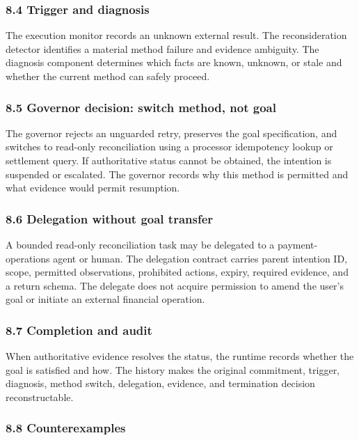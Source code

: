 \subsubsection{8.4 Trigger and diagnosis}\label{trigger-and-diagnosis}

The execution monitor records an unknown external result. The reconsideration detector identifies a material method failure and evidence ambiguity. The diagnosis component determines which facts are known, unknown, or stale and whether the current method can safely proceed.

\subsubsection{8.5 Governor decision: switch method, not goal}\label{governor-decision-switch-method-not-goal}

The governor rejects an unguarded retry, preserves the goal specification, and switches to read-only reconciliation using a processor idempotency lookup or settlement query. If authoritative status cannot be obtained, the intention is suspended or escalated. The governor records why this method is permitted and what evidence would permit resumption.

\subsubsection{8.6 Delegation without goal transfer}\label{delegation-without-goal-transfer}

A bounded read-only reconciliation task may be delegated to a payment-operations agent or human. The delegation contract carries parent intention ID, scope, permitted observations, prohibited actions, expiry, required evidence, and a return schema. The delegate does not acquire permission to amend the user's goal or initiate an external financial operation.

\subsubsection{8.7 Completion and audit}\label{completion-and-audit}

When authoritative evidence resolves the status, the runtime records whether the goal is satisfied and how. The history makes the original commitment, trigger, diagnosis, method switch, delegation, evidence, and termination decision reconstructable.

\subsubsection{8.8 Counterexamples}\label{counterexamples}

